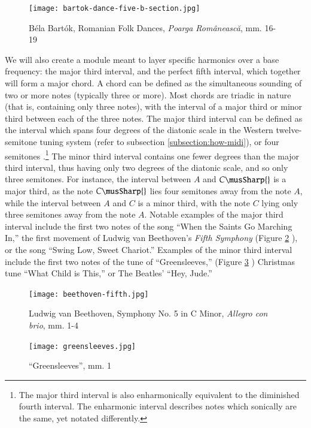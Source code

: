 \begin{figure}[h]
  \centering
  \texttt{[image: bartok-dance-five-b-section.jpg]}
  \caption{Béla Bartók, Romanian Folk Dances, \textit{Poarga Românească}, mm. 16-19}
  \label{fig:bartok-dance-five-b-section}
\end{figure}

We will also create a module meant to layer specific harmonics over a base frequency: the major third interval, and the perfect fifth interval, which together will form a major chord. A chord can be defined as the simultaneous sounding of two or more notes (typically three or more). Most chords are triadic in nature (that is, containing only three notes), with the interval of a major third or minor third between each of the three notes. The major third interval can be defined as the interval which spans four degrees of the diatonic scale in the Western twelve-semitone tuning system (refer to subsection \ref{subsection:how-midi}), or four semitones \cite{Nave_2017}.\footnote{The major third interval is also enharmonically equivalent to the diminished fourth interval. The enharmonic interval describes notes which sonically are the same, yet notated differently.} The minor third interval contains one fewer degrees than the major third interval, thus having only two degrees of the diatonic scale, and so only three semitones. For instance, the interval between $A$ and $C\musSharp{}$ is a major third, as the note $C\musSharp{}$ lies four semitones away from the note $A$, while the interval between $A$ and $C$ is a minor third, with the note $C$ lying only three semitones away from the note $A$. Notable examples of the major third interval include the first two notes of the song ``When the Saints Go Marching In,'' the first movement of Ludwig van Beethoven's \textit{Fifth Symphony} (Figure \ref{fig:beethoven-fifth} \cite{Beethoven_1862}), or the song ``Swing Low, Sweet Chariot.'' Examples of the minor third interval include the first two notes of the tune of ``Greensleeves,'' (Figure \ref{fig:greensleeves} \cite{Kurtz_2010}) Christmas tune ``What Child is This,'' or The Beatles' ``Hey, Jude.''

\begin{figure}[ht]
  \centering
  \texttt{[image: beethoven-fifth.jpg]}
  \caption{Ludwig van Beethoven, Symphony No. 5 in C Minor, \textit{Allegro con brio}, mm. 1-4}
  \label{fig:beethoven-fifth}
\end{figure}

\begin{figure}[H]
  \centering
  \texttt{[image: greensleeves.jpg]}
  \caption{``Greensleeves'', mm. 1}
  \label{fig:greensleeves}
\end{figure}

